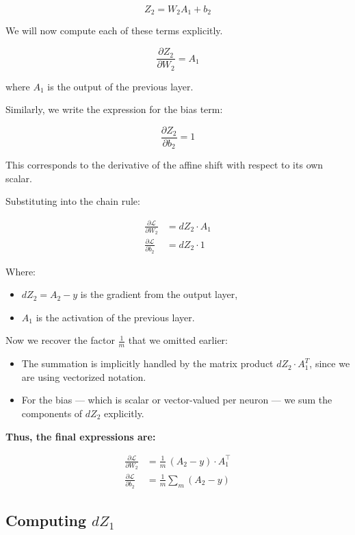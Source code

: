 \documentclass[11pt]{article}
\begin{document}
\[
Z_2 = W_2 A_1 + b_2
\]

We will now compute each of these terms explicitly.

\[
\frac{\partial Z_2}{\partial W_2} = A_1
\]

where \( A_1 \) is the output of the previous layer.

Similarly, we write the expression for the bias term:

\[
\frac{\partial Z_2}{\partial b_2} = 1
\]

This corresponds to the derivative of the affine shift with respect to its own scalar.

Substituting into the chain rule:

\[
\begin{aligned}
\frac{\partial \mathcal{L}}{\partial W_2} &= dZ_2 \cdot A_1 \\
\frac{\partial \mathcal{L}}{\partial b_2} &= dZ_2 \cdot 1
\end{aligned}
\]

Where:
\begin{itemize}
  \item \( dZ_2 = A_2 - y \) is the gradient from the output layer,
  \item \( A_1 \) is the activation of the previous layer.
\end{itemize}

Now we recover the factor \( \frac{1}{m} \) that we omitted earlier:

\begin{itemize}
  \item The summation is implicitly handled by the matrix product \( dZ_2 \cdot A_1^T \), since we are using vectorized notation.
  \item For the bias — which is scalar or vector-valued per neuron — we sum the components of \( dZ_2 \) explicitly.
\end{itemize}

\textbf{Thus, the final expressions are:}

\begin{resultbox}[title=Layer 2 Gradients]
\[
\begin{aligned}
\frac{\partial \mathcal{L}}{\partial W_2} &= \frac{1}{m} \, (A_2 - y) \cdot A_1^\top \\[0.5em]
\frac{\partial \mathcal{L}}{\partial b_2} &= \frac{1}{m} \sum_m (A_2 - y)
\end{aligned}
\]
\end{resultbox}
\subsection{Computing $dZ_1$}
\end{document}
